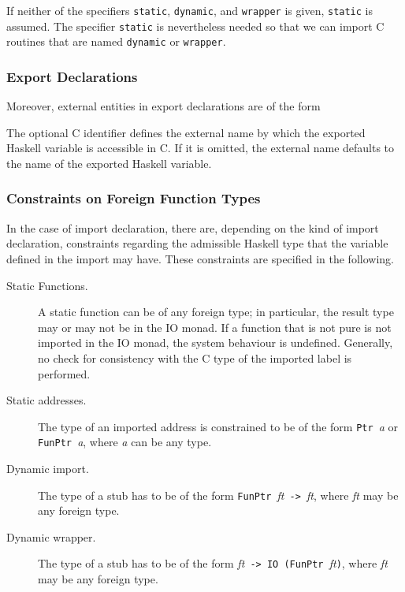 \documentclass[a4paper,twosides]{article}
\newcommand{\code}[1]{\texttt{#1}}      %
\begin{document}
If neither of the specifiers \code{static}, \code{dynamic}, and \code{wrapper}
is given, \code{static} is assumed.  The specifier \code{static} is
nevertheless needed so that we can import C routines that are named
\code{dynamic} or \code{wrapper}.

\subsubsection{Export Declarations}

Moreover, external entities in  export declarations are of the
form
%
\begin{grammar}
\end{grammar}
%
The optional C identifier  defines the external name by which the
exported Haskell variable is accessible in C.  If it is omitted, the external
name defaults to the name of the exported Haskell variable.

\subsubsection{Constraints on Foreign Function Types}

In the case of import declaration, there are, depending on the kind of import
declaration, constraints regarding the admissible Haskell type that the
variable defined in the import may have.  These constraints are specified in
the following.
%
\begin{description}
\item[Static Functions.]  A static function can be of any foreign type; in
  particular, the result type may or may not be in the IO monad.  If a
  function that is not pure is not imported in the IO monad, the system
  behaviour is undefined.  Generally, no check for consistency with the C type
  of the imported label is performed.

\item[Static addresses.]  The type of an imported address is constrained to be
  of the form \code{Ptr }\textit{a} or \code{FunPtr }\textit{a}, where
  \textit{a} can be any type.

\item[Dynamic import.]  The type of a  stub has to be of the
  form \code{FunPtr }\textit{ft}\code{ -> }\textit{ft}, where \textit{ft} may
  be any foreign type.

\item[Dynamic wrapper.]  The type of a  stub has to be of the
  form \textit{ft}\code{ -> }\code{IO (FunPtr }\textit{ft}\code), where
  \textit{ft} may be any foreign type.
\end{description}
\end{document}
